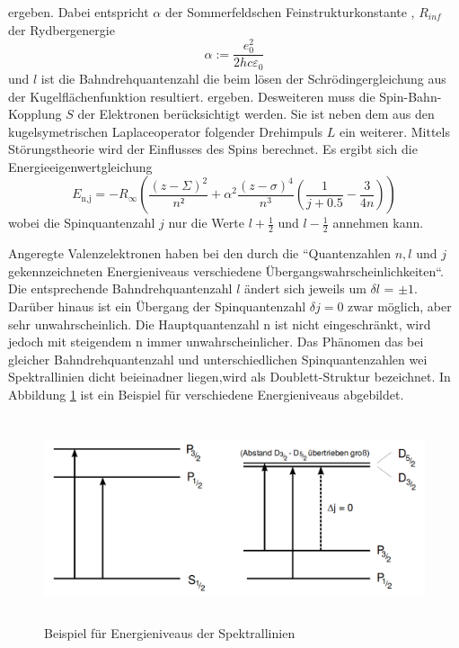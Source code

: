 ergeben. Dabei entspricht $\alpha$ der Sommerfeldschen Feinstrukturkonstante , $R_{inf}$ der Rydbergenergie
\begin{equation}
  \alpha := \frac{e_0^2}{2 h c \varepsilon_0}
  \label{eqn:alpha}
\end{equation}
und $l$ ist die Bahndrehquantenzahl die beim lösen der Schrödingergleichung aus der Kugelflächenfunktion resultiert.  
ergeben. Desweiteren muss die Spin-Bahn-Kopplung $S$ der Elektronen berücksichtigt werden. Sie ist neben dem aus den kugelsymetrischen Laplaceoperator folgender Drehimpuls $L$ ein weiterer. Mittels Störungstheorie wird der Einflusses des Spins berechnet. Es ergibt sich die Energieeigenwertgleichung 
\begin{equation}
  E_\text{n,j} = -R_{\infty}\left( \frac{(z - \Sigma)^2}{n²} + \alpha^2 \frac{(z - \sigma)^4}{n^3} \left( \frac{1}{j + 0.5} - \frac{3}{4n} \right) \right)
  \label{<++>}
\end{equation}
wobei die Spinquantenzahl $j$ nur die Werte $l + \frac{1}{2}$ und $l - \frac{1}{2}$ annehmen kann. 

Angeregte Valenzelektronen haben bei den durch die ``Quantenzahlen $n ,l$ und $j$ gekennzeichneten Energieniveaus verschiedene Übergangswahrscheinlichkeiten``.	Die entsprechende Bahndrehquantenzahl $l$ ändert sich jeweils um $\delta l$ = $\pm 1$. Darüber hinaus ist ein Übergang der Spinquantenzahl $\delta j = 0$ zwar möglich, aber sehr unwahrscheinlich. Die Hauptquantenzahl n ist nicht eingeschränkt, wird jedoch mit steigendem n immer unwahrscheinlicher. Das Phänomen das bei gleicher Bahndrehquantenzahl und unterschiedlichen Spinquantenzahlen wei Spektrallinien dicht beieinadner liegen,wird als Doublett-Struktur bezeichnet. In Abbildung \ref{fig:ene} ist ein Beispiel für verschiedene Energieniveaus abgebildet.
\begin{figure}
  \centering
  \includegraphics[height=6cm]{picture/eniv.png}
  \caption{Beispiel für Energieniveaus der Spektrallinien \cite{sample}}
  \label{fig:ene}
\end{figure}

